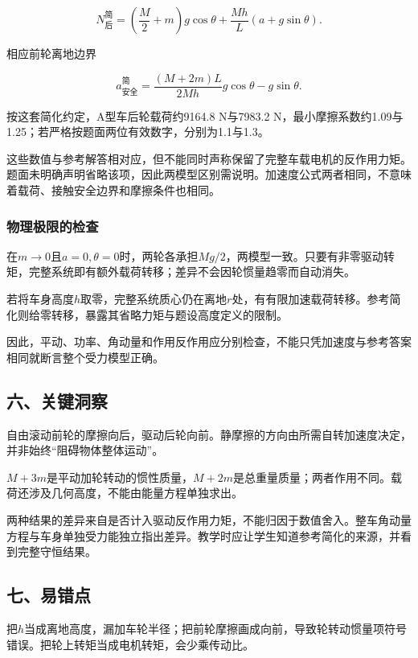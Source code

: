 \documentclass[12pt,a4paper,fontset=fandol]{ctexart}
\begin{document}
\[
\boxed{
N_{\text{后}}^{\text{简}}
=\left(\frac M2+m\right)g\cos\theta
+\frac{Mh}L(a+g\sin\theta)}.
\]

相应前轮离地边界

\[
a_{\text{安全}}^{\text{简}}
=\frac{(M+2m)L}{2Mh}g\cos\theta-g\sin\theta.
\]

按这套简化约定，A型车后轮载荷约9164.8 N与7983.2
N，最小摩擦系数约1.09与1.25；若严格按题面两位有效数字，分别为1.1与1.3。

这些数值与参考解答相对应，但不能同时声称保留了完整车载电机的反作用力矩。题面未明确声明省略该项，因此两模型区别需说明。加速度公式两者相同，不意味着载荷、接触安全边界和摩擦条件也相同。

\subsubsection{物理极限的检查}\label{ux7269ux7406ux6781ux9650ux7684ux68c0ux67e5}

在\(m\to0\)且\(a=0,\theta=0\)时，两轮各承担\(Mg/2\)，两模型一致。只要有非零驱动转矩，完整系统即有额外载荷转移；差异不会因轮惯量趋零而自动消失。

若将车身高度\(h\)取零，完整系统质心仍在离地\(r\)处，有有限加速载荷转移。参考简化则给零转移，暴露其省略力矩与题设高度定义的限制。

因此，平动、功率、角动量和作用反作用应分别检查，不能只凭加速度与参考答案相同就断言整个受力模型正确。

\subsection{六、关键洞察}\label{ux516dux5173ux952eux6d1eux5bdf-6}

自由滚动前轮的摩擦向后，驱动后轮向前。静摩擦的方向由所需自转加速度决定，并非始终``阻碍物体整体运动''。

\(M+3m\)是平动加轮转动的惯性质量，\(M+2m\)是总重量质量；两者作用不同。载荷还涉及几何高度，不能由能量方程单独求出。

两种结果的差异来自是否计入驱动反作用力矩，不能归因于数值舍入。整车角动量方程与车身单独受力能独立指出差异。教学时应让学生知道参考简化的来源，并看到完整守恒结果。

\subsection{七、易错点}\label{ux4e03ux6613ux9519ux70b9-6}

把\(h\)当成离地高度，漏加车轮半径；把前轮摩擦画成向前，导致轮转动惯量项符号错误。把轮上转矩当成电机转矩，会少乘传动比。
\end{document}
